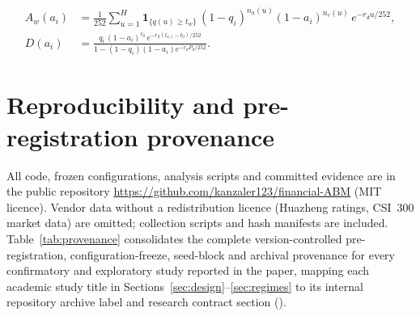 \documentclass[11pt]{article}
\begin{document}
\begin{enumerate}[leftmargin=*]
\begin{align*}
A_w(a_i) &= \frac{1}{252}\sum_{u=1}^H \mathbf{1}_{\{q(u)\ge t_w\}}\,(1 - q_i)^{n_a(u)}(1 - a_i)^{n_c(u)}\,e^{-r_d u/252},\\
D(a_i) &= \frac{q_i\,(1 - a_i)^{c_0}\,e^{-r_d(t_{a,1}-t_0)/252}}{1 - (1 - q_i)(1 - a_i)e^{-r_d P_d/252}}.
\end{align*}
\end{enumerate}

\section{Reproducibility and pre-registration provenance}\label{app:repro}

All code, frozen configurations, analysis scripts and committed evidence are in the public repository \url{https://github.com/kanzaler123/financial-ABM} (MIT licence). Vendor data without a redistribution licence (Huazheng ratings, CSI~300 market data) are omitted; collection scripts and hash manifests are included. Table~\ref{tab:provenance} consolidates the complete version-controlled pre-registration, configuration-freeze, seed-block and archival provenance for every confirmatory and exploratory study reported in the paper, mapping each academic study title in Sections~\ref{sec:design}--\ref{sec:regimes} to its internal repository archive label and research contract section ().
\end{document}
